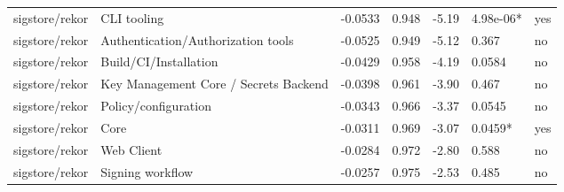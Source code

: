 \begin{table}[t]
\begin{tabular}{lllllll}
sigstore/rekor & CLI tooling & -0.0533 & 0.948 & -5.19 & 4.98e-06* & yes \\
sigstore/rekor & Authentication/Authorization tools & -0.0525 & 0.949 & -5.12 & 0.367 & no \\
sigstore/rekor & Build/CI/Installation & -0.0429 & 0.958 & -4.19 & 0.0584 & no \\
sigstore/rekor & Key Management Core / Secrets Backend & -0.0398 & 0.961 & -3.90 & 0.467 & no \\
sigstore/rekor & Policy/configuration & -0.0343 & 0.966 & -3.37 & 0.0545 & no \\
sigstore/rekor & Core & -0.0311 & 0.969 & -3.07 & 0.0459* & yes \\
sigstore/rekor & Web Client & -0.0284 & 0.972 & -2.80 & 0.588 & no \\
sigstore/rekor & Signing workflow & -0.0257 & 0.975 & -2.53 & 0.485 & no \\
\hline
\end{tabular}
\end{table}

